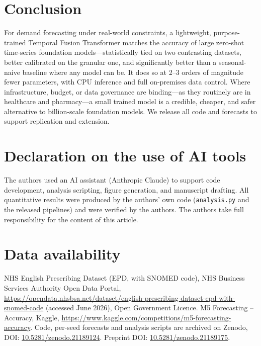 \documentclass[11pt]{article}
\begin{document}
\section{Conclusion}
For demand forecasting under real-world constraints, a lightweight, purpose-trained Temporal
Fusion Transformer matches the accuracy of large zero-shot time-series foundation
models---statistically tied on two contrasting datasets, better calibrated on the granular
one, and significantly better than a seasonal-naive baseline where any model can be. It does
so at 2--3 orders of magnitude fewer parameters, with CPU inference and full on-premises data
control. Where infrastructure, budget, or data governance are binding---as they routinely are
in healthcare and pharmacy---a small trained model is a credible, cheaper, and safer
alternative to billion-scale foundation models. We release all code and forecasts to support
replication and extension.

\section*{Declaration on the use of AI tools}
The authors used an AI assistant (Anthropic Claude) to support code development, analysis
scripting, figure generation, and manuscript drafting. All quantitative results were produced
by the authors' own code (\texttt{analysis.py} and the released pipelines) and were verified
by the authors. The authors take full responsibility for the content of this article.

\section*{Data availability}
NHS English Prescribing Dataset (EPD, with SNOMED code), NHS Business Services Authority Open
Data Portal, \url{https://opendata.nhsbsa.net/dataset/english-prescribing-dataset-epd-with-snomed-code}
(accessed June 2026), Open Government Licence. M5 Forecasting -- Accuracy, Kaggle,
\url{https://www.kaggle.com/competitions/m5-forecasting-accuracy}. Code, per-seed forecasts and
analysis scripts are archived on Zenodo, DOI: \href{https://doi.org/10.5281/zenodo.21189124}{10.5281/zenodo.21189124}.
Preprint DOI: \href{https://doi.org/10.5281/zenodo.21189175}{10.5281/zenodo.21189175}.
\end{document}
